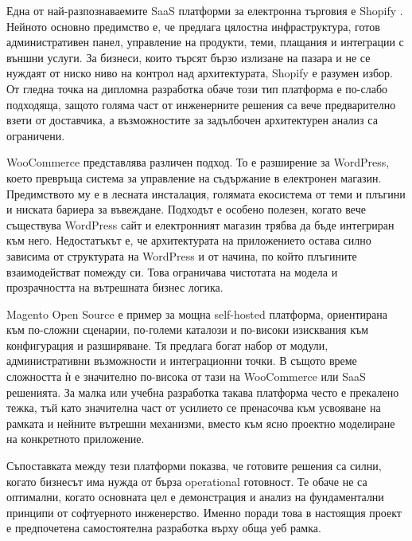 Една от най-разпознаваемите SaaS платформи за електронна търговия е Shopify \cite{shopify}. Нейното основно предимство е, че предлага цялостна инфраструктура, готов административен панел, управление на продукти, теми, плащания и интеграции с външни услуги. За бизнеси, които търсят бързо излизане на пазара и не се нуждаят от ниско ниво на контрол над архитектурата, Shopify е разумен избор. От гледна точка на дипломна разработка обаче този тип платформа е по-слабо подходяща, защото голяма част от инженерните решения са вече предварително взети от доставчика, а възможностите за задълбочен архитектурен анализ са ограничени.

WooCommerce \cite{woocommerce} представлява различен подход. То е разширение за WordPress, което превръща система за управление на съдържание в електронен магазин. Предимството му е в лесната инсталация, голямата екосистема от теми и плъгини и ниската бариера за въвеждане. Подходът е особено полезен, когато вече съществува WordPress сайт и електронният магазин трябва да бъде интегриран към него. Недостатъкът е, че архитектурата на приложението остава силно зависима от структурата на WordPress и от начина, по който плъгините взаимодействат помежду си. Това ограничава чистотата на модела и прозрачността на вътрешната бизнес логика.

Magento Open Source \cite{magento} е пример за мощна self-hosted платформа, ориентирана към по-сложни сценарии, по-големи каталози и по-високи изисквания към конфигурация и разширяване. Тя предлага богат набор от модули, административни възможности и интеграционни точки. В същото време сложността ѝ е значително по-висока от тази на WooCommerce или SaaS решенията. За малка или учебна разработка такава платформа често е прекалено тежка, тъй като значителна част от усилието се пренасочва към усвояване на рамката и нейните вътрешни механизми, вместо към ясно проектно моделиране на конкретното приложение.

Съпоставката между тези платформи показва, че готовите решения са силни, когато бизнесът има нужда от бърза operational готовност. Те обаче не са оптимални, когато основната цел е демонстрация и анализ на фундаментални принципи от софтуерното инженерство. Именно поради това в настоящия проект е предпочетена самостоятелна разработка върху обща уеб рамка.

